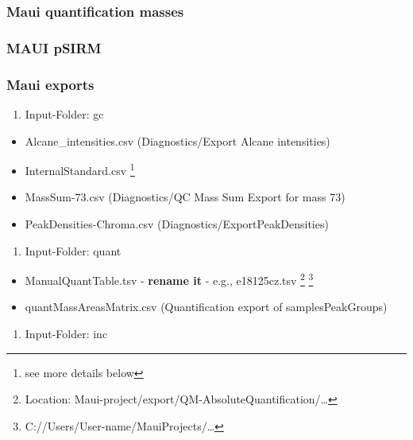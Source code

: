 \documentclass[]{book}
\providecommand{\tightlist}{%
  \setlength{\itemsep}{0pt}\setlength{\parskip}{0pt}}
\let\rmarkdownfootnote\footnote%
\def\footnote{\protect\rmarkdownfootnote}
\theoremstyle{definition}
\theoremstyle{definition}
\theoremstyle{definition}
\theoremstyle{remark}
\begin{document}
\subsubsection{Maui quantification
masses}\label{maui-quantification-masses}

\subsubsection{MAUI pSIRM}\label{maui-psirm}

\subsubsection{Maui exports}\label{mauiexport}

\begin{enumerate}
\def\labelenumi{\arabic{enumi}.}
\tightlist
\item
  Input-Folder: gc
\end{enumerate}

\begin{itemize}
\tightlist
\item
  Alcane\_intensities.csv (Diagnostics/Export Alcane intensities)
\item
  InternalStandard.csv \footnote{see more details below}
\item
  MassSum-73.csv (Diagnostics/QC Mass Sum Export for mass 73)
\item
  PeakDensities-Chroma.csv (Diagnostics/ExportPeakDensities)
\end{itemize}

\begin{enumerate}
\def\labelenumi{\arabic{enumi}.}
\setcounter{enumi}{1}
\tightlist
\item
  Input-Folder: quant
\end{enumerate}

\begin{itemize}
\tightlist
\item
  ManualQuantTable.tsv - \textbf{rename it} - e.g., e18125cz.tsv
  \footnote{Location:
    Maui-project/export/QM-AbsoluteQuantification/\ldots{}} \footnote{C://Users/User-name/MauiProjects/\ldots{}}
\item
  quantMassAreasMatrix.csv (Quantification export of samplesPeakGroups)
\end{itemize}

\begin{enumerate}
\def\labelenumi{\arabic{enumi}.}
\setcounter{enumi}{2}
\tightlist
\item
  Input-Folder: inc
\end{enumerate}
\end{document}
